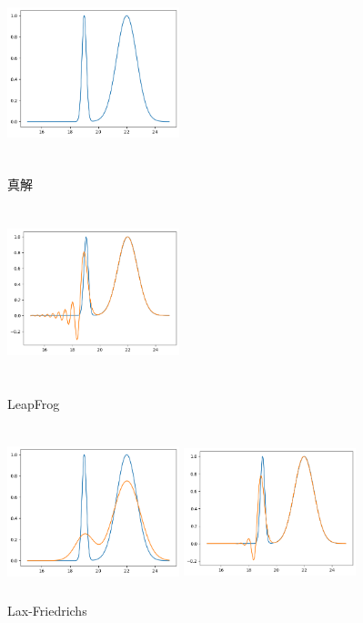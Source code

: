 \documentclass{ctexart}
\begin{document}
\begin{figure}[htbp]
	\begin{minipage}{5cm}
		\centering
		\includegraphics[width = 5cm, height = 5cm]{3-0.png}
		\caption{真解}
		\label{adv0}
	\end{minipage}
	\begin{minipage}{5cm}
		\centering
		\includegraphics[width = 5cm, height = 5cm]{3-1.png}
		\caption{LeapFrog}
		\label{adv1}
	\end{minipage}
	\begin{minipage}{5cm}
		\centering
		\includegraphics[width = 5cm, height = 5cm]{3-2.png}
		\caption{Lax-Friedrichs}
		\label{adv2}
	\end{minipage}
	\begin{minipage}{5cm}
		\centering
		\includegraphics[width = 5cm, height = 5cm]{3-3.png}

\end{minipage}
\end{figure}
\end{document}
